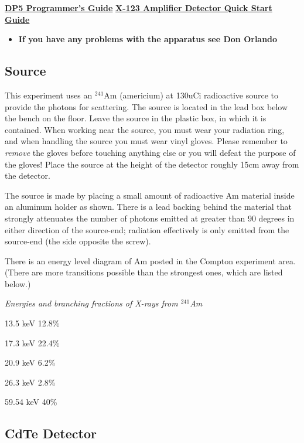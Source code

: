 \documentclass{../lab}
\begin{document}
\href{http://experimentationlab.berkeley.edu/sites/default/files/images/DP5\_Programmers\_Guide\_A4.pdf}{\textbf{DP5 Programmer's Guide}} \href{http://experimentationlab.berkeley.edu/sites/default/files/images/X-123.pdf}{\textbf{X-123 Amplifier Detector Quick Start Guide}}

\begin{itemize}
    \item \textbf{If you have any problems with the apparatus see Don Orlando}
\end{itemize}

\subsection{Source}

This experiment uses an $^{241}$Am (americium) at 130uCi radioactive source to provide the photons for scattering. The source is located in the lead box below the bench on the floor. Leave the source in the plastic box, in which it is contained. When working near the source, you must wear your radiation ring, and when handling the source you must wear vinyl gloves. Please remember to \emph{remove }the gloves before touching anything else or you will defeat the purpose of the gloves! Place the source at the height of the detector roughly 15cm away from the detector.

The source is made by placing a small amount of radioactive Am material inside an aluminum holder as shown. There is a lead backing behind the material that strongly attenuates the number of photons emitted at greater than 90 degrees in either direction of the source-end; radiation effectively is only emitted from the source-end (the side opposite the screw).

There is an energy level diagram of Am posted in the Compton experiment area. (There are more transitions possible than the strongest ones, which are listed below.)

\emph{Energies and branching fractions of X-rays from $^{241}$Am}

13.5 keV 12.8\%

17.3 keV 22.4\%

20.9 keV 6.2\%

26.3 keV 2.8\%

59.54 keV 40\%

\subsection{CdTe Detector}
\end{document}
